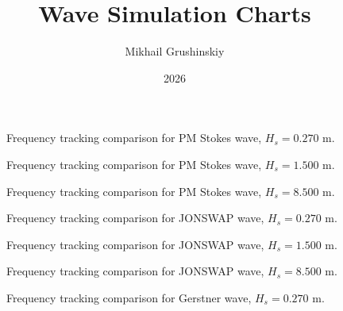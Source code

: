 \documentclass[11pt,letterpaper]{article}
\title{Wave Simulation Charts}
\author{Mikhail Grushinskiy}
\date{2026}
\begin{document}
    \maketitle




    \begin{figure}[H]\centering
    \resizebox{\textwidth}{!}{}
    \caption{Frequency tracking comparison for PM Stokes wave, $H_s = 0.270$ m.}
    \label{fig:freqtrack_pmstokes_low}
    \end{figure}

    \begin{figure}[H]\centering
    \resizebox{\textwidth}{!}{}
    \caption{Frequency tracking comparison for PM Stokes wave, $H_s = 1.500$ m.}
    \label{fig:freqtrack_pmstokes_medium}
    \end{figure}

    \begin{figure}[H]\centering
    \resizebox{\textwidth}{!}{}
    \caption{Frequency tracking comparison for PM Stokes wave, $H_s = 8.500$ m.}
    \label{fig:freqtrack_pmstokes_high}
    \end{figure}

    \begin{figure}[H]\centering
    \resizebox{\textwidth}{!}{}
    \caption{Frequency tracking comparison for JONSWAP wave, $H_s = 0.270$ m.}
    \label{fig:freqtrack_jonswap_low}
    \end{figure}

    \begin{figure}[H]\centering
    \resizebox{\textwidth}{!}{}
    \caption{Frequency tracking comparison for JONSWAP wave, $H_s = 1.500$ m.}
    \label{fig:freqtrack_jonswap_medium}
    \end{figure}

    \begin{figure}[H]\centering
    \resizebox{\textwidth}{!}{}
    \caption{Frequency tracking comparison for JONSWAP wave, $H_s = 8.500$ m.}
    \label{fig:freqtrack_jonswap_high}
    \end{figure}

    \begin{figure}[H]\centering
    \resizebox{\textwidth}{!}{}
    \caption{Frequency tracking comparison for Gerstner wave, $H_s = 0.270$ m.}
    \label{fig:freqtrack_gerstner_low}
    \end{figure}
\end{document}
